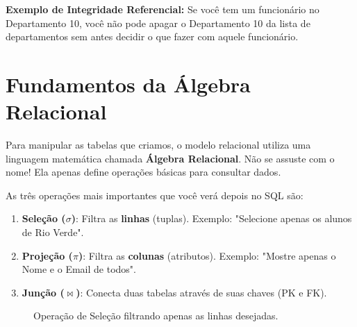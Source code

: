 \begin{quadro_dica}
\textbf{Exemplo de Integridade Referencial:} Se você tem um funcionário no Departamento 10, você não pode apagar o Departamento 10 da lista de departamentos sem antes decidir o que fazer com aquele funcionário.
\end{quadro_dica}

\section{Fundamentos da Álgebra Relacional}

Para manipular as tabelas que criamos, o modelo relacional utiliza uma linguagem matemática chamada \textbf{Álgebra Relacional}. Não se assuste com o nome! Ela apenas define operações básicas para consultar dados.

As três operações mais importantes que você verá depois no SQL são:

\begin{enumerate}
    \item \textbf{Seleção ($\sigma$)}: Filtra as \textbf{linhas} (tuplas). Exemplo: "Selecione apenas os alunos de Rio Verde".
    \item \textbf{Projeção ($\pi$)}: Filtra as \textbf{colunas} (atributos). Exemplo: "Mostre apenas o Nome e o Email de todos".
    \item \textbf{Junção ($\bowtie$)}: Conecta duas tabelas através de suas chaves (PK e FK).
\end{enumerate}

\begin{figure}[H]
    \centering
    \caption{Operação de Seleção filtrando apenas as linhas desejadas.}
\end{figure}
